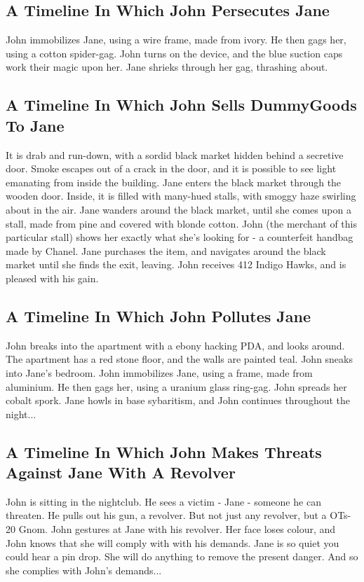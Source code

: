 \documentclass{article}
\begin{document}
\subsection{A Timeline In Which John Persecutes Jane}


John immobilizes Jane, using a wire frame, made from ivory.
He then gags her, using a cotton spider{-}gag.
John turns on the device, and the blue suction caps work their magic upon her.
Jane shrieks through her gag, thrashing about.
\subsection{A Timeline In Which John Sells DummyGoods To Jane}


It is drab and run{-}down, with a sordid black market hidden behind a secretive door.
Smoke escapes out of a crack in the door, and it is possible to see light emanating from inside the building.
Jane enters the black market through the wooden door.
Inside, it is filled with many{-}hued stalls, with smoggy haze swirling about in the air.
Jane wanders around the black market, until she comes upon a stall, made from pine and covered with blonde cotton.
John (the merchant of this particular stall) shows her exactly what she's looking for {-} a counterfeit handbag made by Chanel.
Jane purchases the item, and navigates around the black market until she finds the exit, leaving.
John receives 412 Indigo Hawks, and is pleased with his gain.
\subsection{A Timeline In Which John Pollutes Jane}


John breaks into the apartment with a ebony hacking PDA, and looks around.
The apartment has a red stone floor, and the walls are painted teal.
John sneaks into Jane's bedroom.
John immobilizes Jane, using a frame, made from aluminium.
He then gags her, using a uranium glass ring{-}gag.
John spreads her cobalt spork.
Jane howls in base sybaritism, and John continues throughout the night...
\subsection{A Timeline In Which John Makes Threats Against Jane With A Revolver}


John is sitting in the nightclub.
He sees a victim {-} Jane {-} someone he can threaten. He pulls out his gun, a revolver.
But not just any revolver, but a OTs{-}20 Gnom.
John gestures at Jane with his revolver. Her face loses colour, and John knows that she will comply with with his demands.
Jane is so quiet you could hear a pin drop. She will do anything to remove the present danger. And so she complies with John's demands...
\end{document}
